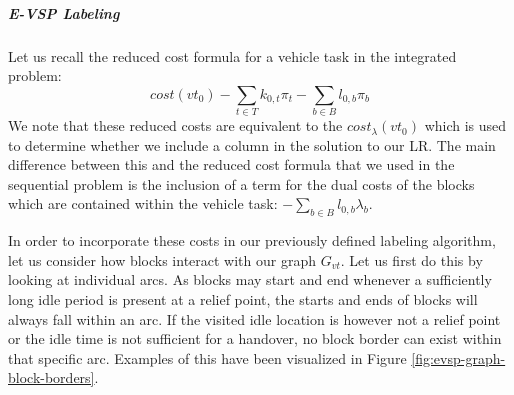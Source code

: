 \documentclass[]{article}
\begin{document}
\subparagraph{E-VSP Labeling} Let us recall the reduced cost formula for a vehicle task in the integrated problem: 
\begin{equation}
cost(vt_0) - \sum_{t \in T}k_{0,t} \pi_t - \sum_{b \in B}l_{0,b}\pi_b \nonumber
\end{equation}
We note that these reduced costs are equivalent to the $cost_\lambda(vt_0)$ which is used to determine whether we include a column in the solution to our LR. The main difference between this and the reduced cost formula that we used in the sequential problem is the inclusion of a term for the dual costs of the blocks which are contained within the vehicle task: $-\sum_{b \in B}l_{0,b}\lambda_b$.

In order to incorporate these costs in our previously defined labeling algorithm, let us consider how blocks interact with our graph $G_{vt}$. Let us first do this by looking at individual arcs. As blocks may start and end whenever a sufficiently long idle period is present at a relief point, the starts and ends of blocks will always fall within an arc. If the visited idle location is however not a relief point or the idle time is not sufficient for a handover, no block border can exist within that specific arc. Examples of this have been visualized in Figure \ref{fig:evsp-graph-block-borders}.
\end{document}
